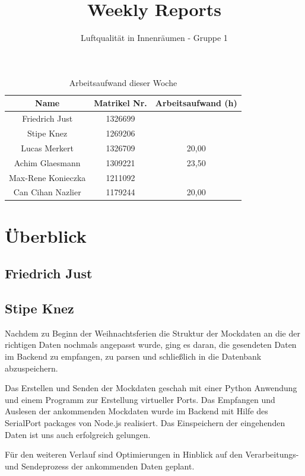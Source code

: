 \documentclass[]{article}
\title{Weekly Reports}
\author{Luftqualität in Innenräumen - Gruppe 1}
\begin{document}
\maketitle

\begin{table}[h!]
	\centering
	\begin{tabular}{|c|c|c|}
		\hline
		{\textbf{Name}}				&		{\textbf{Matrikel Nr.}} & {\textbf{Arbeitsaufwand (h)}} \\
		\hline
		Friedrich Just				&		1326699 				&		\\
		\hline
		Stipe Knez				&		1269206 				&		\\
		\hline
		Lucas Merkert				&		1326709					&	20,00	\\
		\hline
		Achim Glaesmann				&		1309221					&	23,50	\\
		\hline
		Max-Rene Konieczka			&		1211092					&		\\
		\hline
		Can Cihan Nazlier			&		1179244					&	20,00	\\
		\hline
	\end{tabular}
	\caption{Arbeitsaufwand dieser Woche}
	\label{tab:worakload}
\end{table}



\section{Überblick}


\subsection{Friedrich Just}

\subsection{Stipe Knez}
Nachdem zu Beginn der Weihnachtsferien die Struktur der Mockdaten an die der richtigen Daten nochmals angepasst wurde, ging es daran, die gesendeten Daten im Backend zu empfangen, zu parsen und schließlich in die Datenbank abzuspeichern.
 
Das Erstellen und Senden der Mockdaten geschah mit einer Python Anwendung und einem Programm zur Erstellung virtueller Ports. Das Empfangen und Auslesen der ankommenden Mockdaten wurde im Backend mit Hilfe des  SerialPort packages von Node.js realisiert. Das Einspeichern der eingehenden Daten ist uns auch erfolgreich gelungen.

Für den weiteren Verlauf sind Optimierungen in Hinblick auf den Verarbeitungs- und Sendeprozess der ankommenden Daten geplant.
\end{document}
